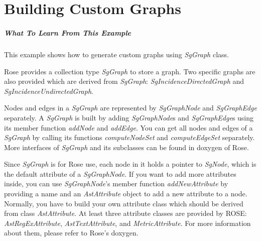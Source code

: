 \chapter{Building Custom Graphs}
\label{Tutorial:chapterCustomGraphs}

\paragraph{What To Learn From This Example}
This example shows how to generate custom graphs using \textit{SgGraph} class.

Rose provides a collection type \textit{SgGraph} to store a graph. Two specific graphs
are also provided which are derived from \textit{SgGraph}: \textit{SgIncidenceDirectedGraph} and
\textit{SgIncidenceUndirectedGraph}.

Nodes and edges in a \textit{SgGraph} are represented by \textit{SgGraphNode} and \textit{SgGraphEdge} separately. 
A \textit{SgGraph} is built by adding \textit{SgGraphNode}s and \textit{SgGraphEdge}s using its member function
\textit{addNode} and \textit{addEdge}. You can get all nodes and edges of a \textit{SgGraph} by calling its functions
\textit{computeNodeSet} and \textit{computeEdgeSet} separately.
More interfaces of \textit{SgGraph} and its subclasses can be found in doxygen of Rose.

Since \textit{SgGraph} is for Rose use, each node in it holds a pointer to \textit{SgNode}, which is 
the default attribute of a \textit{SgGraphNode}. If you want to add more attributes inside, you
can use \textit{SgGraphNode}'s member function \textit{addNewAttribute} by providing a name and an \textit{AstAttribute}
object to add a new attribute to a node. Normally, you have to build your own 
attribute class which should be derived from class
\textit{AstAttribute}. At least three attribute
classes are provided by ROSE: \textit{AstRegExAttribute}, \textit{AstTextAttribute}, and \textit{MetricAttribute}. 
For more information about them, please refer to Rose's doxygen. 


